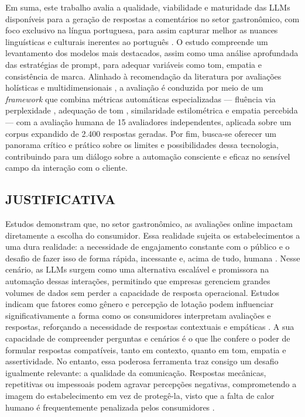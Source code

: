 Em suma, este trabalho avalia a qualidade, viabilidade e maturidade das LLMs disponíveis para a geração de respostas a comentários no setor gastronômico, com foco exclusivo na língua portuguesa, para assim capturar melhor as nuances linguísticas e culturais inerentes ao português \cite{araujo2024}. O estudo compreende um levantamento dos modelos mais destacados, assim como uma análise aprofundada das estratégias de prompt, para adequar variáveis como tom, empatia e consistência de marca. Alinhado à recomendação da literatura por avaliações holísticas e multidimensionais \cite{liang2023,celikyilmaz2021}, a avaliação é conduzida por meio de um \textit{framework} que combina métricas automáticas especializadas --- fluência via perplexidade \cite{pistotti2025}, adequação de tom \cite{danescu2013}, similaridade estilométrica \cite{abbasi2008} e empatia percebida \cite{barriere2023} --- com a avaliação humana de 15 avaliadores independentes, aplicada sobre um corpus expandido de 2.400 respostas geradas. Por fim, busca-se oferecer um panorama crítico e prático sobre os limites e possibilidades dessa tecnologia, contribuindo para um diálogo sobre a automação consciente e eficaz no sensível campo da interação com o cliente.



\subsection{JUSTIFICATIVA}

Estudos demonstram que, no setor gastronômico, as avaliações online impactam diretamente a escolha do consumidor. Essa realidade sujeita os estabelecimentos a uma dura realidade: a necessidade de engajamento constante com o público e o desafio de fazer isso de forma rápida, incessante e, acima de tudo, humana \cite{aureliano2021}. Nesse cenário, as LLMs surgem como uma alternativa escalável e promissora na automação dessas interações, permitindo que empresas gerenciem grandes volumes de dados sem perder a capacidade de resposta operacional. Estudos indicam que fatores como gênero e percepção de lotação podem influenciar significativamente a forma como os consumidores interpretam avaliações e respostas, reforçando a necessidade de respostas contextuais e empáticas \cite{ali2021}. A sua capacidade de compreender perguntas e cenários é o que lhe confere o poder de formular respostas compatíveis, tanto em contexto, quanto em tom, empatia e assertividade. No entanto, essa poderosa ferramenta traz consigo um desafio igualmente relevante: a qualidade da comunicação. Respostas mecânicas, repetitivas ou impessoais podem agravar percepções negativas, comprometendo a imagem do estabelecimento em vez de protegê-la, visto que a falta de calor humano é frequentemente penalizada pelos consumidores \cite{sands2020}.


